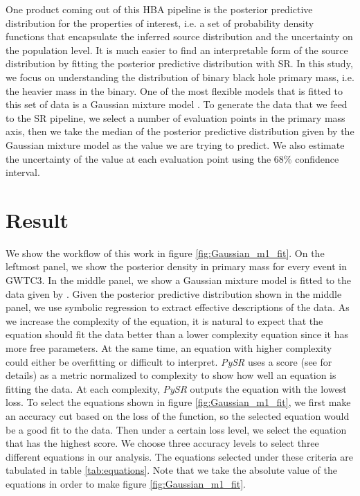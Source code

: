 \documentclass[nohyperref]{article}
\newcommand\pysr{\textit{PySR}\xspace}
\theoremstyle{plain}
\theoremstyle{definition}
\theoremstyle{remark}
\begin{document}
\newcommand\ppd{posterior predictive distribution\xspace} %
\newcommand{\defineppd}{} %

One product coming out of this HBA pipeline is the posterior predictive distribution \defineppd for the properties of interest, i.e. a set of probability density functions that encapsulate the inferred source distribution and the uncertainty on the population level.
It is much easier to find an interpretable form of the source distribution by fitting the \ppd with SR.
In this study, we focus on understanding the distribution of binary black hole primary mass, i.e. the heavier mass in the binary.
One of the most flexible models that is fitted to this set of data is a Gaussian mixture model \cite{Tiwari:2020vym}.
To generate the data that we feed to the SR pipeline,
we select a number of evaluation points in the primary mass axis,
then we take the median of the \ppd given by the Gaussian mixture model as the value we are trying to predict.
We also estimate the uncertainty of the value at each evaluation point using the $68\%$ confidence interval.

\section{Result}
\label{sec:result}

We show the workflow of this work in figure \ref{fig:Gaussian_m1_fit}.
On the leftmost panel, we show the posterior density in primary mass for every event in GWTC3.
In the middle panel, we show a Gaussian mixture model is fitted to the data given by \cite{Tiwari:2020vym}.
Given the \ppd shown in the middle panel, we use symbolic regression to extract effective descriptions of the data. 
As we increase the complexity of the equation, it is natural to expect that the equation should fit the data better than a lower complexity equation since it has more free parameters.
At the same time, an equation with higher complexity could either be overfitting or difficult to interpret.
\pysr uses a score (see \citealt{cranmerDiscoveringSymbolicModels2020} for details) as a metric normalized to complexity to show how well an equation is fitting the data.
At each complexity, \pysr outputs the equation with the lowest loss.
To select the equations shown in figure \ref{fig:Gaussian_m1_fit}, we first make an accuracy cut based on the loss of the function, so the selected equation would be a good fit to the data.
Then under a certain loss level, we select the equation that has the highest score.
We choose three accuracy levels to select three different equations in our analysis.
The equations selected under these criteria are tabulated in table \ref{tab:equations}.
Note that we take the absolute value of the equations in order to make figure \ref{fig:Gaussian_m1_fit}.
\end{document}
